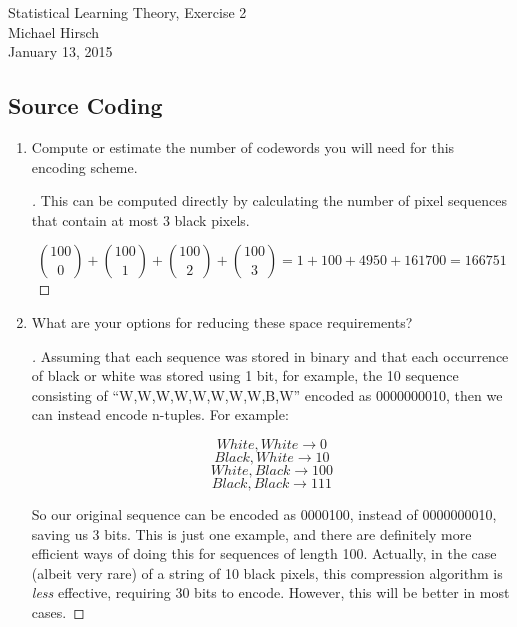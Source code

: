 \documentclass[]{book}
\theoremstyle{definition}
\begin{document}
\begin{center}
{\Large Statistical Learning Theory, Exercise 2}\\
Michael Hirsch\\ %
January 13, 2015 %
\end{center}

\vspace{0.2 cm}


\subsection*{Source Coding}


\begin{enumerate}
\item\label{norms}

Compute or estimate the number of codewords you will need for this encoding scheme.

\begin{proof}[\unskip\nopunct]
	This can be computed directly by calculating the number of pixel sequences that contain at most 3 black pixels.

	$${100 \choose 0} + {100 \choose 1} + {100 \choose 2} + {100 \choose 3} = 1 + 100 + 4950 + 161700 = 166751$$
\end{proof}

\item

What are your options for reducing these space requirements?

\begin{proof}[\unskip\nopunct]
Assuming that each sequence was stored in binary and that each occurrence of black or white was stored using 1 bit, for example, the 10 sequence consisting of ``W,W,W,W,W,W,W,W,B,W'' encoded as 0000000010, then we can instead encode n-tuples. For example:

$$White, White \rightarrow 0$$
$$Black, White \rightarrow 10$$
$$White, Black \rightarrow 100$$
$$Black, Black \rightarrow 111$$

So our original sequence can be encoded as 0000100, instead of 0000000010, saving us 3 bits. This is just one example, and there are definitely more efficient ways of doing this for sequences of length 100. Actually, in the case (albeit very rare) of a string of 10 black pixels, this compression algorithm is \textit{less} effective, requiring 30 bits to encode. However, this will be better in most cases.




\end{proof}
\end{enumerate}
\end{document}
